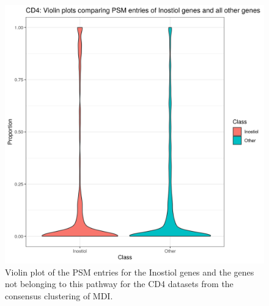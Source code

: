 \documentclass[12pt]{article} %
\begin{document}
\begin{figure}[h]
	\centering
	\includegraphics[scale=0.75]{Images/Biology_data/All_datasets/PSM_densities/KEGG_INOSITOL_PHOSPHATE_METABOLISM/CD4.png}
	\caption{Violin plot of the PSM entries for the Inostiol genes and the genes not belonging to this pathway for the CD4 datasets from the consensus clustering of MDI.}
	\label{fig:mdi_cd4_inostiol_psm_violin}
\end{figure}
	\newpage
	
	
%	
	
	

	
	
\end{document}
